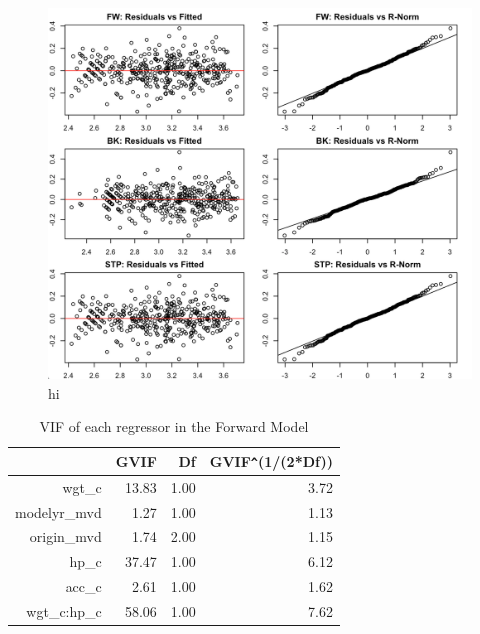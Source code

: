 \documentclass{article}
\begin{document}
\begin{figure}
	\centering
	\includegraphics[width=1\linewidth]{28ti_resfittednorm}
	\caption[TOC Define Me]
	{hi}
\end{figure}

\clearpage
\newpage 

\begin{table}[ht]
\centering
\begin{tabular}{rrrr}
  \hline
 & GVIF & Df & GVIF\verb|^|(1/(2*Df)) \\ 
  \hline
wgt\_c & 13.83 & 1.00 & 3.72 \\ 
  modelyr\_mvd & 1.27 & 1.00 & 1.13 \\ 
  origin\_mvd & 1.74 & 2.00 & 1.15 \\ 
  hp\_c & 37.47 & 1.00 & 6.12 \\ 
  acc\_c & 2.61 & 1.00 & 1.62 \\ 
  wgt\_c:hp\_c & 58.06 & 1.00 & 7.62 \\ 
   \hline
\end{tabular}
\caption{VIF of each regressor in the Forward Model}
\label{tab:myfirsttable}
\end{table}
\end{document}
